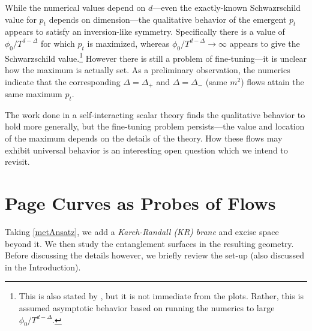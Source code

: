 \documentclass[12pt,a4paper]{article}
\begin{document}
While the numerical values depend on $d$---even the exactly-known Schwazrschild value for $p_t$ depends on dimension---the qualitative behavior of the emergent $p_t$ appears to satisfy an inversion-like symmetry. Specifically there is a value of $\phi_0/T^{d-\Delta}$ for which $p_t$ is maximized, whereas $\phi_0/T^{d-\Delta} \to \infty$ appears to give the Schwarzschild value.\footnote{This is also stated by \cite{Frenkel:2020ysx,Wang:2020nkd}, but it is not immediate from the plots. Rather, this is assumed asymptotic behavior based on running the numerics to large $\phi_0/T^{d-\Delta}$.} However there is still a problem of fine-tuning---it is unclear how the maximum is actually set. As a preliminary observation, the numerics indicate that the corresponding $\Delta = \Delta_+$ and $\Delta = \Delta_-$ (same $m^2$) flows attain the same maximum $p_t$.

The work done in a self-interacting scalar theory \cite{Wang:2020nkd} finds the qualitative behavior to hold more generally, but the fine-tuning problem persists---the value and location of the maximum depends on the details of the theory. How these flows may exhibit universal behavior is an interesting open question which we intend to revisit.

\section{Page Curves as Probes of Flows}\label{sec3}

Taking \eqref{metAnsatz}, we add a \textit{Karch-Randall (KR) brane} and excise space beyond it. We then study the entanglement surfaces in the resulting geometry. Before discussing the details however, we briefly review the set-up (also discussed in the Introduction).
\end{document}
